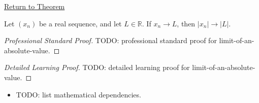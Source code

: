 \newpage
{}
\label{prf:limit-of-an-absolute-value}

\begin{remark*}[Return]
\hyperref[thm:limit-of-an-absolute-value]{Return to Theorem}
\end{remark*}

\begin{theorem*}
Let $(x_n)$ be a real sequence, and let $L\in\mathbb{R}$. If $x_n\to L$,
then $|x_n|\to |L|$.

\smallskip
\noindent
\end{theorem*}

\begin{proof}[Professional Standard Proof]
\LRAProofBodyStart
TODO: professional standard proof for limit-of-an-absolute-value.
\end{proof}

\begin{proof}[Detailed Learning Proof]
\LRAProofBodyStart
TODO: detailed learning proof for limit-of-an-absolute-value.
\end{proof}

\begin{remark*}
\end{remark*}

\begin{dependencies}
\begin{itemize}
  \item TODO: list mathematical dependencies.
\end{itemize}
\end{dependencies}

\clearpage
